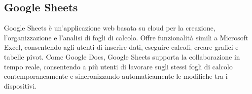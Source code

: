 \vspace{2em}
\subsection*{Google Sheets}
Google Sheets è un'applicazione web basata su cloud per la creazione, l'organizzazione e l'analisi di fogli di calcolo. Offre funzionalità simili a Microsoft Excel, consentendo agli utenti di inserire dati, eseguire calcoli, creare grafici e tabelle pivot. Come Google Docs, Google Sheets supporta la collaborazione in tempo reale, consentendo a più utenti di lavorare sugli stessi fogli di calcolo contemporaneamente e sincronizzando automaticamente le modifiche tra i dispositivi.
